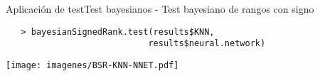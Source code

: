 \documentclass[leqno]{beamer}
\theoremstyle{definition_wo_parentheses}
\begin{document}
\begin{frame}[fragile]{Aplicación de test}{Test bayesianos - Test bayesiano de rangos con signo}
   \begin{verbatim}
   > bayesianSignedRank.test(results$KNN,
                            results$neural.network)
   \end{verbatim}
   \begin{center}
   \texttt{[image: imagenes/BSR-KNN-NNET.pdf]}
   \end{center}
\end{frame}
\end{document}
